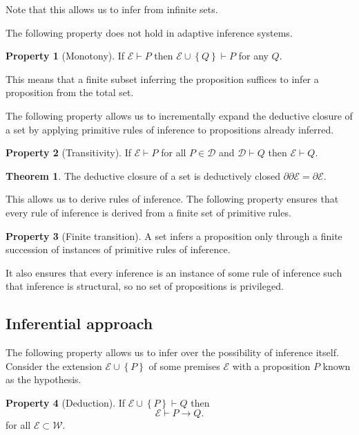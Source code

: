 \documentclass{amsbook}
\newcommand{\setsm}[1]{\left\{#1\right\}}
\newcommand{\wffs}{\mathcal W}
\newcommand{\infers}{\mathrel\vdash}
\newcommand{\then}{\mathrel\rightarrow}
\theoremstyle{definition}
\newtheorem{prop}{Property}[section]
\newtheorem{subprop}[prop]{Property}
\newtheorem{thm}{Theorem}[section]
\begin{document}
Note that this allows us to infer from infinite sets.

The following property does not hold in adaptive inference systems.

\begin{prop}[Monotony]
    If $\mathcal E \infers P$ then $\mathcal E \cup \setsm Q \infers P$ for any $Q$.
\end{prop}

This means that a finite subset inferring the proposition suffices to infer a proposition from the total set.

The following property allows us to incrementally expand the deductive closure of a set by applying primitive rules of inference to propositions already inferred.

\begin{prop}[Transitivity]
    If $\mathcal E \infers P$ for all $P \in \mathcal D$ and $\mathcal D \infers Q$ then $\mathcal E \infers Q$.
\end{prop}

\begin{thm}
    The deductive closure of a set is deductively closed $\partial\partial\mathcal E = \partial\mathcal E$.
\end{thm}

This allows us to derive rules of inference. The following property ensures that every rule of inference is derived from a finite set of primitive rules.

\begin{prop}[Finite transition]
    A set infers a proposition only through a finite succession of instances of primitive rules of inference.
\end{prop}

It also ensures that every inference is an instance of some rule of inference such that inference is structural, so no set of propositions is privileged.

\subsection{Inferential approach}

The following property allows us to infer over the possibility of inference itself. Consider the extension $\mathcal E \cup\setsm P$ of some premises $\mathcal E$ with a proposition $P$ known as the hypothesis.

\begin{subprop}[Deduction]
    If $\mathcal E \cup\setsm P \infers Q$ then
    $$\mathcal E \infers P \then Q.$$
    for all $\mathcal E \subset \wffs$.
\end{subprop}
\end{document}
